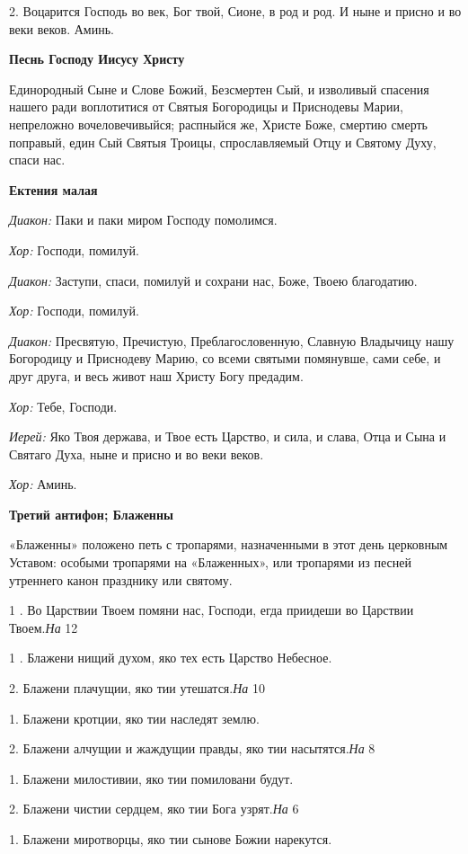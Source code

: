 2. Воцарится Господь во век, Бог твой, Сионе, в род и род. И ныне и присно и во веки веков. Аминь. 

{\bfseries Песнь Господу Иисусу Христу }

Единородный Сыне и Слове Божий, Безсмертен Сый, и изволивый спасения нашего ради воплотитися от Святыя Богородицы и Приснодевы Марии, непреложно вочеловечивыйся; распныйся же, Христе Боже, смертию смерть поправый, един Сый Святыя Троицы, спрославляемый Отцу и Святому Духу, спаси нас. 

{\bfseries Ектения малая }

{\itshape Диакон:} Паки и паки миром Господу помолимся. 

{\itshape Хор:} Господи, помилуй. 

{\itshape Диакон:} Заступи, спаси, помилуй и сохрани нас, Боже, Твоею благодатию. 

{\itshape Хор:} Господи, помилуй. 

{\itshape Диакон:} Пресвятую, Пречистую, Преблагословенную, Славную Владычицу нашу Богородицу и Приснодеву Марию, со всеми святыми помянувше, сами себе, и друг друга, и весь живот наш Христу Богу предадим.

{\itshape Хор:} Тебе, Господи. 

{\itshape Иерей:} Яко Твоя держава, и Твое есть Царство, и сила, и слава, Отца и Сына и Святаго Духа, ныне и присно и во веки веков. 

{\itshape Хор:} Аминь.

{\bfseries Третий антифон; Блаженны }

«Блаженны» положено петь с тропарями, назначенными в этот день церковным Уставом: особыми тропарями на «Блаженных», или тропарями из песней утреннего канон празднику или святому.

1 . Во Царствии Твоем помяни нас, Господи, егда приидеши во Царствии Твоем.{\itshape  На }12 

1 . Блажени нищий духом, яко тех есть Царство Небесное. 

2. Блажени плачущии, яко тии утешатся.{\itshape  На }10 

1. Блажени кротции, яко тии наследят землю. 

2. Блажени алчущии и жаждущии правды, яко тии насытятся.{\itshape  На} 8 

1. Блажени милостивии, яко тии помиловани будут. 

2. Блажени чистии сердцем, яко тии Бога узрят.{\itshape  На} 6 

1. Блажени миротворцы, яко тии сынове Божии нарекутся. 

